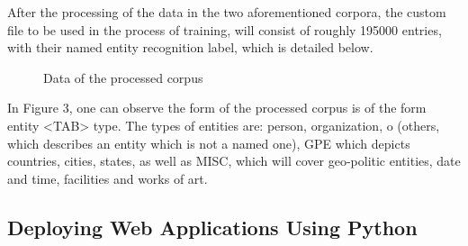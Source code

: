\documentclass[12pt,a4paper]{article}
\begin{document}
\qquad After the processing of the data in the two aforementioned corpora, the custom file to be used in the process of training, will consist of roughly 195000 entries, with their named entity recognition label, which is detailed below.
\begin{figure}[h!]
\begin{center}
\end{center}
\caption{Data of the processed corpus}
\end{figure}

\qquad In Figure 3, one can observe the form of the processed corpus is of the form entity <TAB> type. The types of entities are: person, organization, o (others, which describes an entity which is not a named one), GPE which depicts countries, cities, states, as well as MISC, which will cover geo-politic entities, date and time, facilities and works of art.
\subsection{Deploying Web Applications Using Python}
\end{document}
